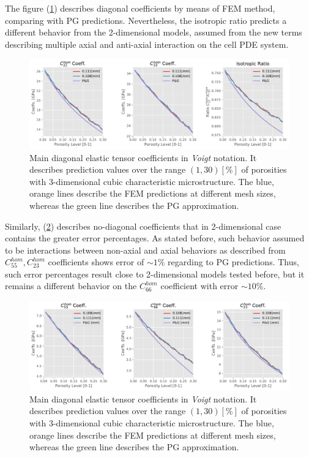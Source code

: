 The figure (\ref{Main3dHomCoeffSquare}) describes diagonal coefficients by means of FEM method, comparing with PG predictions. Nevertheless, the isotropic ratio predicts a different behavior from the 2-dimensional models, assumed from the new terms describing multiple axial and anti-axial interaction on the cell PDE system. 
\begin{figure}[!h]
	\centering
	\includegraphics[scale=.5]{images/CellsProb/3DCellProb_MainHomCoeffsCircular.pdf}
	\caption{Main diagonal elastic tensor coefficients in \textit{Voigt} notation. It describes prediction values over the range $(1,30) [\%]$ of porosities with 3-dimensional cubic characteristic microstructure. The blue, orange lines describe the FEM predictions at different mesh sizes, whereas the green line describes the PG approximation.}
	\label{Main3dHomCoeffSquare}
\end{figure}
Similarly, (\ref{Other3dHomCoeffSquare}) describes no-diagonal coefficients that in 2-dimensional case contains the greater error percentages. As stated before, such behavior assumed to be interactions between non-axial and axial behaviors as described from $C_{55}^{hom}, C_{23}^{hom}$ coefficients shows error of $\sim 1 \%$ regarding to PG predictions. Thus, such error percentages result close to 2-dimensional models tested before, but it remains a different behavior on the $C_{66}^{hom}$ coefficient with error $\sim 10 \%$.

\begin{figure}[!h]
	\centering
	\includegraphics[scale=.5]{images/CellsProb/3DCellProb_OthersHomCoeffsCircular.pdf}
	\caption{Main diagonal elastic tensor coefficients in \textit{Voigt} notation. It describes prediction values over the range $(1,30) [\%]$ of porosities with 3-dimensional cubic characteristic microstructure. The blue, orange lines describe the FEM predictions at different mesh sizes, whereas the green line describes the PG approximation.}
	\label{Other3dHomCoeffSquare}
\end{figure}

